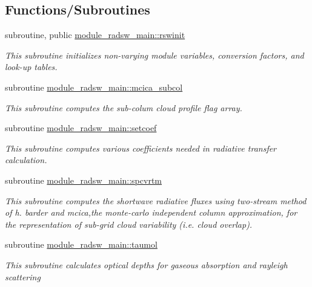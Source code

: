 \subsection*{Functions/\+Subroutines}
\begin{DoxyCompactItemize}
\item 
subroutine, public \hyperlink{group__module__radsw__main_gae7699ffc6a44967214b31d719ec04cbe}{module\+\_\+radsw\+\_\+main\+::rswinit}
\begin{DoxyCompactList}\small\item\em This subroutine initializes non-\/varying module variables, conversion factors, and look-\/up tables. \end{DoxyCompactList}\item 
subroutine \hyperlink{group__module__radsw__main_gae5916f7b0f63f7836a8ab80ce3933482}{module\+\_\+radsw\+\_\+main\+::mcica\+\_\+subcol}
\begin{DoxyCompactList}\small\item\em This subroutine computes the sub-\/colum cloud profile flag array. \end{DoxyCompactList}\item 
subroutine \hyperlink{group__module__radsw__main_gaaa580fe228ccc04abd54368c8df0f312}{module\+\_\+radsw\+\_\+main\+::setcoef}
\begin{DoxyCompactList}\small\item\em This subroutine computes various coefficients needed in radiative transfer calculation. \end{DoxyCompactList}\item 
subroutine \hyperlink{group__module__radsw__main_gae30ee993080f035f0e05cda7c7baffce}{module\+\_\+radsw\+\_\+main\+::spcvrtm}
\begin{DoxyCompactList}\small\item\em This subroutine computes the shortwave radiative fluxes using two-\/stream method of h. barder and mcica,the monte-\/carlo independent column approximation, for the representation of sub-\/grid cloud variability (i.\+e. cloud overlap). \end{DoxyCompactList}\item 
subroutine \hyperlink{group__module__radsw__main_gaafef1e054b5103007f57129c07fcba81}{module\+\_\+radsw\+\_\+main\+::taumol}
\begin{DoxyCompactList}\small\item\em This subroutine calculates optical depths for gaseous absorption and rayleigh scattering ~\newline

\end{DoxyCompactList}
\end{DoxyCompactItemize}
